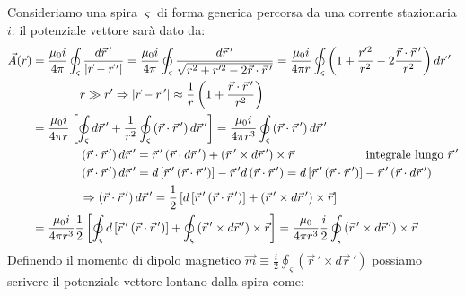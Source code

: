Consideriamo una spira $ \varsigma $ di forma generica percorsa da una corrente stazionaria $ i $: il potenziale vettore sarà dato da:
\begin{equation}
	\begin{split}
		\vec{A}(\vec{r}) &= \displaystyle\frac{\mu_0 i}{4\pi} \oint_{\varsigma} \displaystyle\frac{d\vec{r}\,'}{\left\lvert\vec{r} - \vec{r}\,'\right\rvert} = \displaystyle\frac{\mu_0 i}{4\pi} \oint_{\varsigma} \displaystyle\frac{d\vec{r}\,'}{\sqrt{r^2 + r'^2 - 2\vec{r}\cdot\vec{r}\,'}} = \displaystyle\frac{\mu_0 i}{4\pi r} \oint_{\varsigma} \left( 1 + \displaystyle\frac{r'^2}{r^2} - 2 \displaystyle\frac{\vec{r}\cdot\vec{r}\,'}{r^2} \right) d\vec{r}\,' \\ 
				 & \qquad\qquad r \gg r' \Rightarrow \left\lvert\vec{r} - \vec{r}\,'\right\rvert \approx \frac{1}{r} \left(1 + \frac{\vec{r}\cdot\vec{r}\,'}{r^2}\right) \\ 
				 &= \displaystyle\frac{\mu_0 i}{4\pi r} \left[ \oint_{\varsigma} d\vec{r}\,' + \displaystyle\frac{1}{r^2} \oint_{\varsigma} \left( \vec{r}\cdot\vec{r}\,' \right) d\vec{r}\,' \right] = \displaystyle\frac{\mu_0 i}{4\pi r^3} \oint_{\varsigma} \left( \vec{r}\cdot\vec{r}\,' \right) d\vec{r}\,' \\ 
				 & \qquad\qquad \left(\vec{r}\cdot\vec{r}\,'\right) d\vec{r}\,' = \vec{r}\,' \left(\vec{r}\cdot d\vec{r}\,'\right) + \left(\vec{r}\,'\times d\vec{r}\,'\right)\times\vec{r} \qquad \qquad \qquad \text{integrale lungo } \vec{r}\,' \\ 
				 & \qquad\qquad \left(\vec{r}\cdot\vec{r}\,'\right) d\vec{r}\,' = d\left[\vec{r}\,'\left(\vec{r}\cdot\vec{r}\,'\right)\right] - \vec{r}\,'d\left(\vec{r}\cdot\vec{r}\,'\right) = d\left[\vec{r}\,'\left(\vec{r}\cdot\vec{r}\,'\right)\right] - \vec{r}\,'\left(\vec{r}\cdot d\vec{r}\,'\right) \\ 
				 & \qquad \qquad \Rightarrow \left(\vec{r}\cdot\vec{r}\,'\right)d\vec{r}\,' = \frac{1}{2} \left[ d\left[ \vec{r}\,' \left(\vec{r}\cdot\vec{r}\,'\right)\right] + \left(\vec{r}\,' \times d\vec{r}\,'\right) \times\vec{r} \right] \\ 
				 &= \displaystyle\frac{\mu_0 i}{4\pi r^3} \displaystyle\frac{1}{2} \left[ \oint_{\varsigma} d\left[ \vec{r}\,' \left(\vec{r}\cdot\vec{r}\,'\right)\right] + \oint_{\varsigma} \left(\vec{r}\,' \times d\vec{r}\,'\right) \times\vec{r} \right] = \displaystyle\frac{\mu_0}{4\pi r^3} \displaystyle\frac{i}{2} \oint_{\varsigma} \left(\vec{r}\,' \times d\vec{r}\,'\right) \times\vec{r} 
	\end{split}
	\label{eq:pot-vett-sp}
\end{equation}
Definendo il momento di dipolo magnetico $ \vec{m} \equiv \frac{i}{2} \oint_{\varsigma} \left(\vec{r}\,'\times d\vec{r}\,'\right) $ possiamo scrivere il potenziale vettore lontano dalla spira come:

